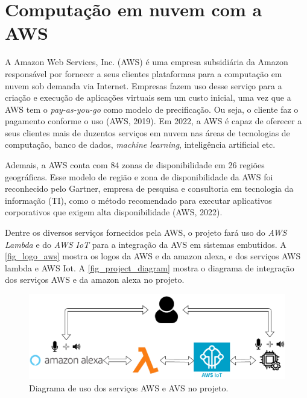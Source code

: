 \documentclass[
    12pt,
    openright,
    twoside,
    a4paper,
    english,
    spanish,
    brazil,
    ]{abntex2}
\begin{document}
\section{Computação em nuvem com a AWS}
A Amazon Web Services, Inc. (AWS) é uma empresa subsidiária da Amazon responsável por fornecer a seus clientes plataformas para a computação em nuvem sob demanda via Internet. Empresas fazem uso desse serviço para a criação e execução de aplicações virtuais sem um custo inicial, uma vez que a AWS tem o  \textit{pay-as-you-go} como modelo de precificação. Ou seja, o cliente faz o pagamento conforme o uso (AWS, 2019). Em 2022, a AWS é capaz de oferecer a seus clientes mais de duzentos serviços em nuvem nas áreas de tecnologias de computação, banco de dados, \textit{machine learning}, inteligência artificial etc.

Ademais, a AWS conta com 84 zonas de disponibilidade em 26 regiões geográficas. Esse modelo de região e zona de disponibilidade da AWS foi reconhecido pelo Gartner, empresa de pesquisa e consultoria em tecnologia da informação (TI), como o método recomendado para executar aplicativos corporativos que exigem alta disponibilidade (AWS, 2022).

Dentre os diversos serviços fornecidos pela AWS, o projeto fará uso do \textit{AWS Lambda} e do \textit{AWS IoT} para a integração da AVS em sistemas embutidos. A \autoref{fig_logo_aws} mostra os logos da AWS e da amazon alexa, e dos serviços AWS lambda e AWS Iot. A \autoref{fig_project_diagram} mostra o diagrama de integração dos serviços AWS e da amazon alexa no projeto.

\begin{figure}[htb]
	\caption{\label{fig_project_diagram}Diagrama de uso dos serviços AWS e AVS no projeto.}
	\begin{center}
		\includegraphics[scale=0.5]{Images/project_diagram.pdf}
	\end{center}
\end{figure}
\end{document}
